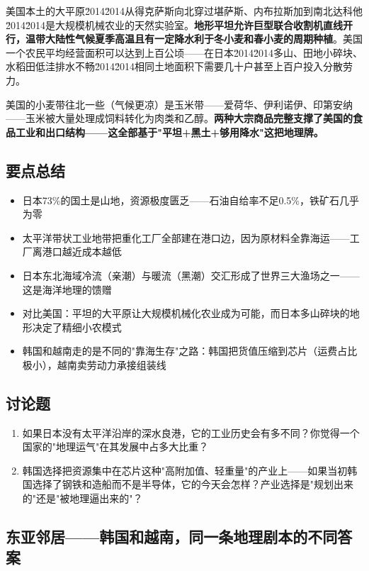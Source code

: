\documentclass[a4paper,12pt]{ctexart}
\begin{document}
美国本土的大平原\u2014\u2014从得克萨斯向北穿过堪萨斯、内布拉斯加到南北达科他\u2014\u2014是大规模机械农业的天然实验室。\textbf{地形平坦允许巨型联合收割机直线开行，温带大陆性气候夏季高温且有一定降水利于冬小麦和春小麦的周期种植}。美国一个农民平均经营面积可以达到上百公顷——在日本\u2014\u2014多山、田地小碎块、水稻田低洼排水不畅\u2014\u2014相同土地面积下需要几十户甚至上百户投入分散劳力。

美国的小麦带往北一些（气候更凉）是玉米带——爱荷华、伊利诺伊、印第安纳——玉米被大量处理成饲料转化为肉类和乙醇。\textbf{两种大宗商品完整支撑了美国的食品工业和出口结构——这全部基于"平坦+黑土+够用降水"这把地理牌。}

\subsection*{要点总结}
\begin{itemize}
  \item 日本73\%的国土是山地，资源极度匮乏——石油自给率不足0.5\%，铁矿石几乎为零
  \item 太平洋带状工业地带把重化工厂全部建在港口边，因为原材料全靠海运——工厂离港口越近成本越低
  \item 日本东北海域冷流（亲潮）与暖流（黑潮）交汇形成了世界三大渔场之一——这是海洋地理的馈赠
  \item 对比美国：平坦的大平原让大规模机械化农业成为可能，而日本多山碎块的地形决定了精细小农模式
  \item 韩国和越南走的是不同的"靠海生存"之路：韩国把货值压缩到芯片（运费占比极小），越南卖劳动力承接组装线
\end{itemize}

\subsection*{讨论题}
\begin{enumerate}
  \item 如果日本没有太平洋沿岸的深水良港，它的工业历史会有多不同？你觉得一个国家的"地理运气"在其发展中占多大比重？
  \item 韩国选择把资源集中在芯片这种"高附加值、轻重量"的产业上——如果当初韩国选择了钢铁和造船而不是半导体，它的今天会怎样？产业选择是"规划出来的"还是"被地理逼出来的"？
\end{enumerate}

\newpage
\subsection*{东亚邻居——韩国和越南，同一条地理剧本的不同答案}
\end{document}
